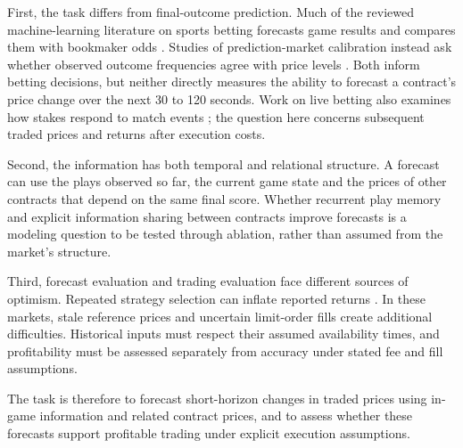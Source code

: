 \documentclass[12pt,a4paper,oneside]{report}
\begin{document}
First, the task differs from final-outcome prediction. Much of the reviewed
machine-learning literature on sports betting forecasts game results and compares
them with bookmaker odds
\citep{bunker2019machine,galekwa2024systematic,hubacek2019exploiting}.
Studies of prediction-market calibration instead ask whether observed outcome
frequencies agree with price levels \citep{burgi2025makers,moshrefi2026prices}.
Both inform betting decisions, but neither directly measures the ability to
forecast a contract's price change over the next 30 to 120 seconds. Work on live
betting also examines how stakes respond to match events
\citep{otting2022reaction}; the question here concerns subsequent traded prices
and returns after execution costs.

Second, the information has both temporal and relational structure. A forecast
can use the plays observed so far, the current game state and the prices of other
contracts that depend on the same final score. Whether recurrent play memory and
explicit information sharing between contracts improve forecasts is a modeling
question to be tested through ablation, rather than assumed from the market's
structure.

Third, forecast evaluation and trading evaluation face different sources of
optimism. Repeated strategy selection can inflate reported returns
\citep{bailey2014pseudo,lopezdeprado2018advances}. In these markets, stale
reference prices and uncertain limit-order fills create additional difficulties.
Historical inputs must respect their assumed availability times, and profitability
must be assessed separately from accuracy under stated fee and fill assumptions.

The task is therefore to forecast short-horizon changes in traded prices using
in-game information and related contract prices, and to assess whether these
forecasts support profitable trading under explicit execution assumptions.
\end{document}
